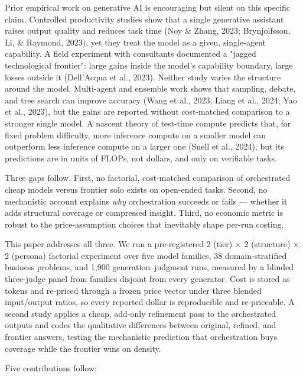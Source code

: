 \documentclass[11pt,a4paper]{article}
\begin{document}
Prior empirical work on generative AI is encouraging but silent on this
specific claim. Controlled productivity studies show that a single generative
assistant raises output quality and reduces task time (Noy \& Zhang, 2023;
Brynjolfsson, Li, \& Raymond, 2023), yet they treat the model as a given,
single-agent capability. A field experiment with consultants documented a
"jagged technological frontier": large gains inside the model's capability
boundary, large losses outside it (Dell'Acqua et al., 2023). Neither study
varies the structure around the model. Multi-agent and ensemble work shows
that sampling, debate, and tree search can improve accuracy (Wang et al.,
2023; Liang et al., 2024; Yao et al., 2023), but the gains are reported
without cost-matched comparison to a stronger single model. A nascent
theory of test-time compute predicts that, for fixed problem difficulty,
more inference compute on a smaller model can outperform less inference
compute on a larger one (Snell et al., 2024), but its predictions are in
units of FLOPs, not dollars, and only on verifiable tasks.

Three gaps follow. First, no factorial, cost-matched comparison of
orchestrated cheap models versus frontier solo exists on open-ended
tasks. Second, no mechanistic account explains \textit{why} orchestration succeeds
or fails — whether it adds structural coverage or compressed insight.
Third, no economic metric is robust to the price-assumption choices that
inevitably shape per-run costing.

This paper addresses all three. We run a pre-registered 2 (tier) ×
2 (structure) × 2 (persona) factorial experiment over five model families,
38 domain-stratified business problems, and 1,900 generation–judgment
runs, measured by a blinded three-judge panel from families disjoint
from every generator. Cost is stored as tokens and re-priced through a
frozen price vector under three blended input/output ratios, so every
reported dollar is reproducible and re-priceable. A second study applies
a cheap, add-only refinement pass to the orchestrated outputs and codes
the qualitative differences between original, refined, and frontier
answers, testing the mechanistic prediction that orchestration buys
coverage while the frontier wins on density.

Five contributions follow:
\end{document}

